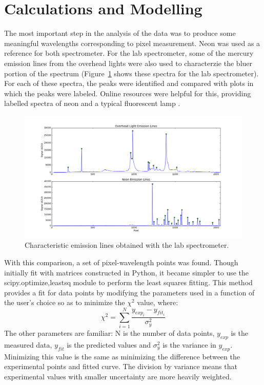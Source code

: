 \documentclass[a4paper,12pt]{article}
\begin{document}
\section{Calculations and Modelling}
\label{sec:calc}

The most important step in the analysis of the data was to produce some meaningful wavelengths corresponding to pixel measurement. Neon was used as a reference for both spectrometer. For the lab spectrometer, some of the mercury emission lines from the overhead lights were also used to characterzie the bluer portion of the spectrum (Figure~\ref{fig:labneon} shows these spectra for the lab spectrometer). For each of these spectra, the peaks were identified and compared with plots in which the peaks were labeled. Online resources were helpful for this, providing labelled spectra of neon \citep{neline} and a typical fluorescent lamp \citep{hgline}.

\begin{figure}[!htbp]
\centering
\includegraphics[scale = 0.35]{lab_neon_mercury.png}
\caption{Characteristic emission lines obtained with the lab spectrometer.}
\label{fig:labneon}
\end{figure}

With this comparison, a set of pixel-wavelength points was found. Though initially fit with matrices constructed in Python, it became simpler to use the scipy.optimize,leastsq module to perform the least squares fitting. This method provides a fit for data points by modifying the parameters used in a function of the user's choice so as to minimize the $\chi^2$ value, where:
\begin{equation}
\chi^2= {\sum_{i=1}^{N}{\frac{y_{exp_{i}}-y_{fit_{i}}}{\sigma^2_y}}}
\end{equation}
The other parameters are familiar: N is the number of data points, $y_{exp}$ is the measured data, $y_{fit}$ is the predicted values and $\sigma^2_y$ is the variance in $y_{exp}$. Minimizing this value is the same as minimizing the difference between the experimental points and fitted curve. The division by variance means that experimental values with smaller uncertainty are more heavily weighted.
\end{document}
